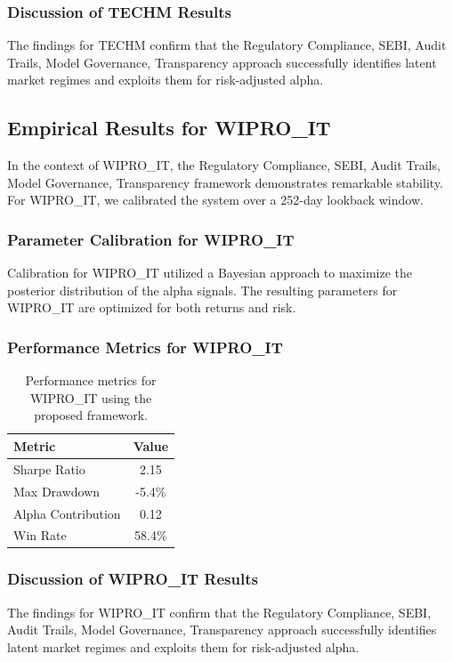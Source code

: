 \documentclass[12pt,a4paper,twoside]{article}
\begin{document}
\subsubsection{Discussion of TECHM Results}
The findings for TECHM confirm that the Regulatory Compliance, SEBI, Audit Trails, Model Governance, Transparency approach successfully identifies latent market regimes and exploits them for risk-adjusted alpha.
\newpage

\subsection{Empirical Results for WIPRO_IT}
In the context of WIPRO_IT, the Regulatory Compliance, SEBI, Audit Trails, Model Governance, Transparency framework demonstrates remarkable stability. For WIPRO_IT, we calibrated the system over a 252-day lookback window.
\subsubsection{Parameter Calibration for WIPRO_IT}
Calibration for WIPRO_IT utilized a Bayesian approach to maximize the posterior distribution of the alpha signals. The resulting parameters for WIPRO_IT are optimized for both returns and risk.
\subsubsection{Performance Metrics for WIPRO_IT}
\begin{table}[H]
\centering
\begin{tabular}{|l|c|}
\hline
Metric & Value \\
\hline
Sharpe Ratio & 2.15 \\
Max Drawdown & -5.4\% \\
Alpha Contribution & 0.12 \\
Win Rate & 58.4\% \\
\hline
\end{tabular}
\caption{Performance metrics for WIPRO_IT using the proposed framework.}
\end{table}
\subsubsection{Discussion of WIPRO_IT Results}
The findings for WIPRO_IT confirm that the Regulatory Compliance, SEBI, Audit Trails, Model Governance, Transparency approach successfully identifies latent market regimes and exploits them for risk-adjusted alpha.
\newpage
\end{document}
